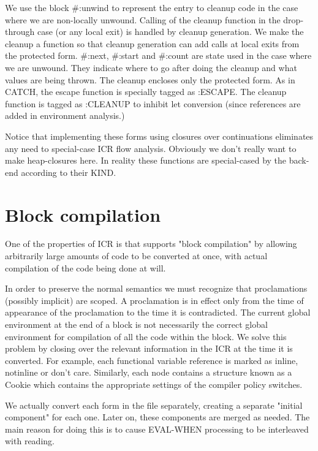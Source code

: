 We use the block \#:unwind to represent the entry to cleanup code in the case
where we are non-locally unwound.  Calling of the cleanup function in the
drop-through case (or any local exit) is handled by cleanup generation.  We
make the cleanup a function so that cleanup generation can add calls at local
exits from the protected form.  \#:next, \#:start and \#:count are state used in
the case where we are unwound.  They indicate where to go after doing the
cleanup and what values are being thrown.  The cleanup encloses only the
protected form.  As in CATCH, the escape function is specially tagged as
:ESCAPE.  The cleanup function is tagged as :CLEANUP to inhibit let conversion
(since references are added in environment analysis.)

Notice that implementing these forms using closures over continuations
eliminates any need to special-case ICR flow analysis.  Obviously we don't
really want to make heap-closures here.  In reality these functions are
special-cased by the back-end according to their KIND.


\section{Block compilation}

One of the properties of ICR is that supports "block compilation" by allowing
arbitrarily large amounts of code to be converted at once, with actual
compilation of the code being done at will.


In order to preserve the normal semantics we must recognize that proclamations
(possibly implicit) are scoped.  A proclamation is in effect only from the time
of appearance of the proclamation to the time it is contradicted.  The current
global environment at the end of a block is not necessarily the correct global
environment for compilation of all the code within the block.  We solve this
problem by closing over the relevant information in the ICR at the time it is
converted.  For example, each functional variable reference is marked as
inline, notinline or don't care.  Similarly, each node contains a structure
known as a Cookie which contains the appropriate settings of the compiler
policy switches.

We actually convert each form in the file separately, creating a separate
"initial component" for each one.  Later on, these components are merged as
needed.  The main reason for doing this is to cause EVAL-WHEN processing to be
interleaved with reading. 


